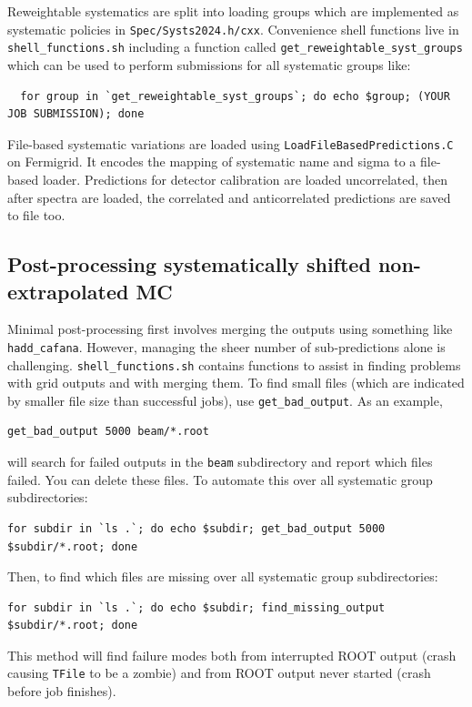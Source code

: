 \documentclass{article}
\begin{document}
Reweightable systematics are split into loading groups which are implemented as systematic policies in \texttt{Spec/\-Systs2024.h/cxx}. Convenience shell functions live in \texttt{shell\_\-functions\-.sh} including a function called \texttt{get\_\-reweightable\_\-syst\_\-groups} which can be used to perform submissions for all systematic groups like:
\begin{verbatim}
  for group in `get_reweightable_syst_groups`; do echo $group; (YOUR JOB SUBMISSION); done
\end{verbatim}

File-based systematic variations are loaded using \texttt{Load\-File\-Based\-Predictions\-.C} on Fermigrid. It encodes the mapping of systematic name and sigma to a file-based loader. Predictions for detector calibration are loaded uncorrelated, then after spectra are loaded, the correlated and anticorrelated predictions are saved to file too.

\subsection{Post-processing systematically shifted non-extrapolated MC}
Minimal post-processing first involves merging the outputs using something like \texttt{hadd\_cafana}. However, managing the sheer number of sub-predictions alone is challenging. \texttt{shell\_\-functions\-.sh} contains functions to assist in finding problems with grid outputs and with merging them. To find small files (which are indicated by smaller file size than successful jobs), use \texttt{get\_bad\_output}. As an example,
\begin{verbatim}
get_bad_output 5000 beam/*.root
\end{verbatim}
will search for failed outputs in the \texttt{beam} subdirectory and report which files failed. You can delete these files. To automate this over all systematic group subdirectories:
\begin{verbatim}
for subdir in `ls .`; do echo $subdir; get_bad_output 5000 $subdir/*.root; done
\end{verbatim}
Then, to find which files are missing over all systematic group subdirectories:
\begin{verbatim}
for subdir in `ls .`; do echo $subdir; find_missing_output $subdir/*.root; done
\end{verbatim}
This method will find failure modes both from interrupted ROOT output (crash causing \texttt{TFile} to be a zombie) and from ROOT output never started (crash before job finishes).
\end{document}
